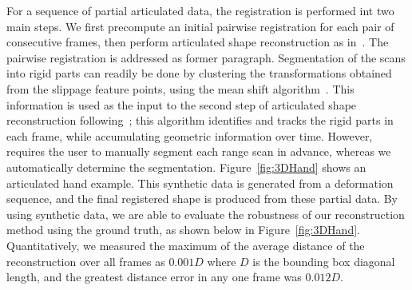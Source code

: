 For a sequence of partial articulated data, the registration is performed int two main steps.
We first precompute an initial pairwise registration for each pair of consecutive frames, then perform articulated shape reconstruction as in~\cite{Pekelny08}.
The pairwise registration is addressed as former paragraph.
Segmentation of the scans into rigid parts can readily be done by clustering the transformations obtained from the slippage feature points,
using the mean shift algorithm~\cite{Comaniciu02}.
This information is used as the input to the second step of articulated shape reconstruction following~\cite{Pekelny08};
this algorithm identifies and tracks the rigid parts in each frame, while accumulating  geometric information over time.
However,~\cite{Pekelny08} requires the user to manually segment each range scan in advance,  whereas we automatically determine  the segmentation.
Figure~\ref{fig:3DHand} shows an articulated hand example.
This synthetic data is generated from a deformation sequence, and the final registered shape is produced from these partial data.
By using synthetic data, we are able to evaluate the robustness of our reconstruction method using the ground truth, as shown below in Figure~\ref{fig:3DHand}.
Quantitatively, we measured the maximum of the average distance of the reconstruction over all frames as $0.001 D$ where $D$ is the bounding box diagonal length, and
the greatest distance error in any one frame was $0.012 D$.

